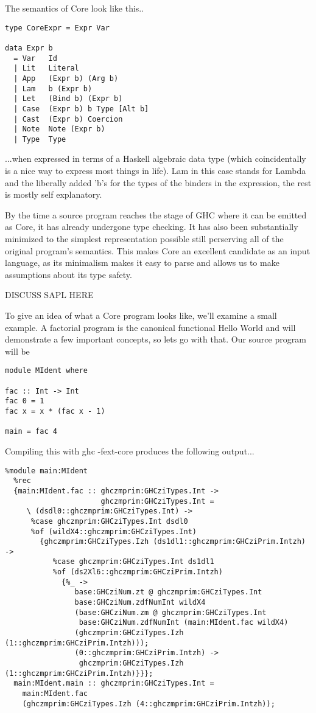 \documentclass[11pt]{article}
\begin{document}
\noindent The semantics of Core look like this..

\begin{verbatim}
type CoreExpr = Expr Var

data Expr b 
  = Var	  Id
  | Lit   Literal
  | App   (Expr b) (Arg b)
  | Lam   b (Expr b)
  | Let   (Bind b) (Expr b)
  | Case  (Expr b) b Type [Alt b]
  | Cast  (Expr b) Coercion
  | Note  Note (Expr b)
  | Type  Type
\end{verbatim}

\noindent ...when expressed in terms of a Haskell algebraic data type (which 
coincidentally is a nice way to express most things in life). Lam in this
case stands for Lambda and the liberally added 'b's for the types of the binders
in the expression, the rest is mostly self explanatory. 

By the time a source program reaches the stage of GHC where it can be emitted
as Core, it has already undergone type checking. It has also been substantially 
minimized to the simplest representation
possible still perserving all of the original program's semantics. This makes
Core an excellent candidate as an input language, as its minimalism makes it
easy to parse and allows us to make assumptions about its type safety.

DISCUSS SAPL HERE

To give an idea of what a Core program looks like, we'll examine a small 
example. A factorial program is the canonical functional Hello World and will
demonstrate a few important concepts, so lets go with that. Our source program
will be 

\begin{verbatim}
module MIdent where

fac :: Int -> Int
fac 0 = 1
fac x = x * (fac x - 1)

main = fac 4
\end{verbatim}

\noindent Compiling this with ghc -fext-core produces the following output...

\pagebreak 

\begin{verbatim}
%module main:MIdent
  %rec
  {main:MIdent.fac :: ghczmprim:GHCziTypes.Int ->
                      ghczmprim:GHCziTypes.Int =
     \ (dsdl0::ghczmprim:GHCziTypes.Int) ->
      %case ghczmprim:GHCziTypes.Int dsdl0
      %of (wildX4::ghczmprim:GHCziTypes.Int)
        {ghczmprim:GHCziTypes.Izh (ds1dl1::ghczmprim:GHCziPrim.Intzh) ->
           %case ghczmprim:GHCziTypes.Int ds1dl1
           %of (ds2Xl6::ghczmprim:GHCziPrim.Intzh)
             {%_ ->
                base:GHCziNum.zt @ ghczmprim:GHCziTypes.Int 
                base:GHCziNum.zdfNumInt wildX4
                (base:GHCziNum.zm @ ghczmprim:GHCziTypes.Int
                 base:GHCziNum.zdfNumInt (main:MIdent.fac wildX4)
                (ghczmprim:GHCziTypes.Izh (1::ghczmprim:GHCziPrim.Intzh)));
                (0::ghczmprim:GHCziPrim.Intzh) ->
                 ghczmprim:GHCziTypes.Izh (1::ghczmprim:GHCziPrim.Intzh)}}};
  main:MIdent.main :: ghczmprim:GHCziTypes.Int =
    main:MIdent.fac
    (ghczmprim:GHCziTypes.Izh (4::ghczmprim:GHCziPrim.Intzh));
\end{verbatim}
\end{document}
